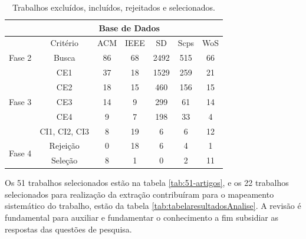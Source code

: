 \begin{longtable}{c|c|c|c|c|c|c|}
\caption{Trabalhos excluídos, incluídos, rejeitados e selecionados.}
\label{tab:fase-revisao-literatura}\\
\cline{2-7}
 & \multicolumn{6}{c|}{Base de Dados} \\ \cline{2-7} 
\endfirsthead
%
\endhead
%
 & Critério & \acrshort{ACM} & \acrlong{IEEE} & \acrlong{SD} & \acrlong{Scps} & \acrlong{WoS} \\ \hline
\multicolumn{1}{|c|}{Fase 2} & Busca & 86 & 68 & 2492 & 515 & 66 \\ \hline
\multicolumn{1}{|c|}{\multirow{5}{*}{Fase 3}} & CE1 & 37 & 18 & 1529 & 259 & 21 \\ \cline{2-7} 
\multicolumn{1}{|c|}{} & CE2 & 18 & 15 & 460 & 156 & 15 \\ \cline{2-7} 
\multicolumn{1}{|c|}{} & CE3 & 14 & 9 & 299 & 61 & 14 \\ \cline{2-7} 
\multicolumn{1}{|c|}{} & CE4 & 9 & 7 & 198 & 33 & 4 \\ \cline{2-7} 
\multicolumn{1}{|c|}{} & CI1, CI2, CI3 & 8 & 19 & 6 & 6 & 12 \\ \hline
\multicolumn{1}{|c|}{\multirow{2}{*}{Fase 4}} & Rejeição & 0 & 18 & 6 & 4 & 1 \\ \cline{2-7} 
\multicolumn{1}{|c|}{} & Seleção & 8 & 1 & 0 & 2 & 11 \\ \hline
\end{longtable}

Os 51 trabalhos selecionados estão na tabela \ref{tab:51-artigos}, e os 22 trabalhos selecionados para  realização da extração contribuíram para o mapeamento sistemático do trabalho, estão da tabela \ref{tab:tabelaresultadosAnalise}. A revisão é fundamental para auxiliar e fundamentar o conhecimento a fim subsidiar as respostas das questões de pesquisa. 

